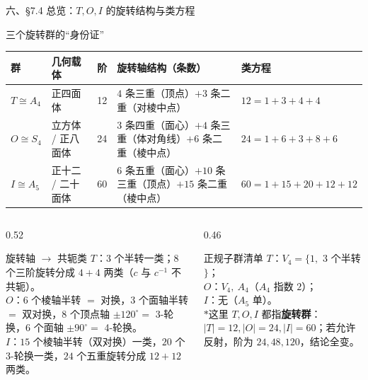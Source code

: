 \documentclass[aspectratio=169,10pt,fontset=none]{ctexbeamer}
\newcommand{\starpt}{\textcolor{accent}{\bfseries$\ast$}}
\begin{document}

\begin{frame}[t]{六、\S7.4 总览：$T,O,I$ 的旋转结构与类方程}
\scriptsize
\begin{block}{\footnotesize 三个旋转群的“身份证”}
\setlength{\tabcolsep}{3pt}
\renewcommand{\arraystretch}{1.12}
\begin{tabular}{@{}p{1.7cm}p{2.2cm}p{0.5cm}p{5.9cm}p{3.2cm}@{}}
\toprule
群 & 几何载体 & 阶 & 旋转轴结构（条数） & 类方程\\
\midrule
$T\cong A_4$ & 正四面体 & 12 & $4$ 条三重（顶点）$+3$ 条二重（对棱中点） & $12=1+3+4+4$\\
$O\cong S_4$ & 立方体 / 正八面体 & 24 & $3$ 条四重（面心）$+4$ 条三重（体对角线）$+6$ 条二重（棱中点） & $24=1+6+3+8+6$\\
$I\cong A_5$ & 正十二 / 二十面体 & 60 & $6$ 条五重（面心）$+10$ 条三重（顶点）$+15$ 条二重（棱中点） & $60=1+15+20+12+12$\\
\bottomrule
\end{tabular}
\end{block}
\begin{columns}[T,onlytextwidth]
\begin{column}{0.52\textwidth}
\begin{block}{\footnotesize 旋转轴 $\to$ 共轭类}
$T$：$3$ 个半转一类；$8$ 个三阶旋转分成 $4+4$ 两类（$c$ 与 $c^{-1}$ 不共轭）。\\
$O$：$6$ 个棱轴半转 $=$ 对换，$3$ 个面轴半转 $=$ 双对换，$8$ 个顶点轴 $\pm120^\circ=$ 3-轮换，$6$ 个面轴 $\pm90^\circ=$ 4-轮换。\\
$I$：$15$ 个棱轴半转（双对换）一类，$20$ 个 3-轮换一类，$24$ 个五重旋转分成 $12+12$ 两类。
\end{block}
\end{column}
\begin{column}{0.46\textwidth}
\begin{block}{\footnotesize 正规子群清单}
$T$：$V_4=\{1,$ 3 个半转$\}$；\\
$O$：$V_4,\ A_4$（$A_4$ 指数 $2$）；\\
$I$：无（$A_5$ 单）。\\[1pt]

\starpt 这里 $T,O,I$ 都指\textbf{旋转群}：$|T|=12,|O|=24,|I|=60$；若允许反射，阶为 $24,48,120$，结论全变。
\end{block}
\end{column}
\end{columns}
\end{frame}
\end{document}

